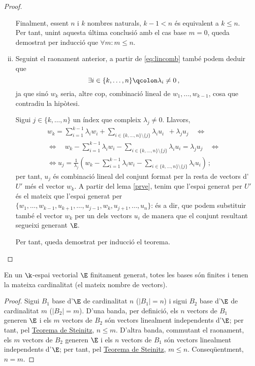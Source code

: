 \begin{specialteo}
\begin{proof}
\begin{enumerate}[i)]
			Finalment, essent $n$ i $k$ nombres naturals, $k-1 < n$ és equivalent a $k \le n$. Per tant, unint aquesta última conclusió amb el cas base $m=0$, queda demostrat per inducció que $\forall m \colon m \le n$.

			\item Seguint el raonament anterior, a partir de \eqref{eq:lincomb} també podem deduir que \[\exists i\in\{k,\ldots,n\}\qcolon \lambda_i \ne 0\,,\] ja que sinó $w_k$ seria, altre cop, combinació lineal de $w_1, \ldots, w_{k-1}$, cosa que contradiu la hipòtesi.
			
			Sigui $j\in\{k, \ldots, n\}$ un índex que compleix $\lambda_j \ne 0$. Llavors,
			\begin{gather*}
				w_k = \sum_{i=1}^{k-1} \lambda_i w_i + \sum_{i \in \{k, \ldots, n\}\setminus \{j\}} \lambda_i u_i  \ \;+ \lambda_j u_j\quad\Leftrightarrow\\
				\Leftrightarrow\quad w_k - \sum_{i=1}^{k-1} \lambda_i w_i - \sum_{i \in \{k, \ldots, n\}\setminus \{j\}} \lambda_i u_i = \lambda_j u_j\quad\Leftrightarrow\\
				\Leftrightarrow u_j = \frac{1}{\lambda_j}\left(w_k - \sum_{i=1}^{k-1} \lambda_i w_i - \sum_{i \in \{k, \ldots, n\}\setminus \{j\}} \lambda_i u_i\right)\,;
			\end{gather*}
			per tant, $u_j$ és combinació lineal del conjunt format per la resta de vectors d'$U'$ més el vector $w_k$. A partir del lema \ref{prve}, tenim que l'espai generat per $U'$ és el mateix que l'espai generat per $\{w_1, \ldots, w_{k-1}, u_{k+1}, \ldots, u_{j-1}, w_k, u_{j+1} , \ldots, u_n\}$: és a dir, que podem substituir també el vector $w_k$ per un dels vectors $u_i$ de manera que el conjunt resultant segueixi generant $\E$. 
			
			Per tant, queda demostrat per inducció el teorema.
		\end{enumerate}
	\end{proof}
	
	\begin{col}
		En un $\k$-espai vectorial $\E$ finitament generat, totes les bases són finites i tenen la mateixa cardinalitat (el mateix nombre de vectors).
	\end{col}
	
	\begin{proof} Sigui $B_1$ base d'$\E$  de cardinalitat $n$ ($|B_1| = n$) i sigui $B_2$ base d'$\E$ de cardinalitat $m$ ($|B_2| = m$). D'una banda, per definició, els $n$ vectors de $B_1$ generen $\E$ i els $m$ vectors de $B_2$ són vectors linealment independents d'$\E$; per tant, pel \hyperref[teo:steinitz]{Teorema de Steinitz}, $n \le m$. D'altra banda, commutant el raonament, els $m$ vectors de $B_2$ generen $\E$ i els $n$ vectors de $B_1$ són vectors linealment independents d'$\E$; per tant, pel \hyperref[teo:steinitz]{Teorema de Steinitz}, $m \le n$.  Conseqüentment, $n=m$.
	\end{proof}
\end{specialteo}




